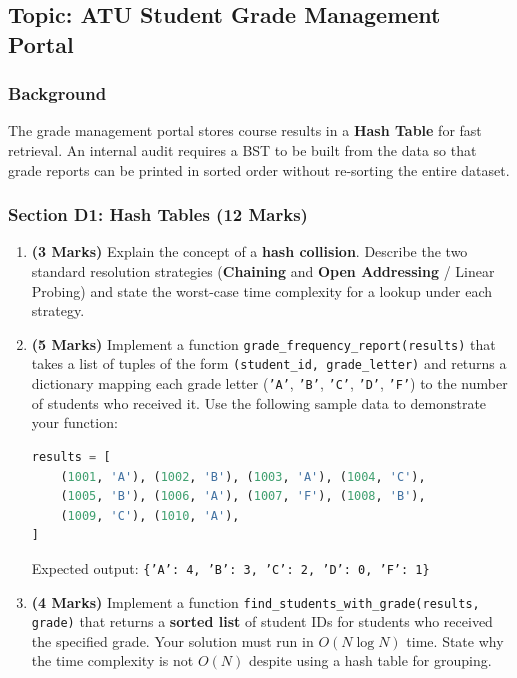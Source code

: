 \documentclass[11pt,a4paper]{article}
\begin{document}
\subsection*{Topic: ATU Student Grade Management Portal}

\subsubsection*{Background}
The grade management portal stores course results in a \textbf{Hash Table} for fast retrieval. An internal audit requires a BST to be built from the data so that grade reports can be printed in sorted order without re-sorting the entire dataset.

\subsubsection*{Section D1: Hash Tables (12 Marks)}

\begin{enumerate}[label=\textbf{D\arabic*.}]
    \item \textbf{(3 Marks)} Explain the concept of a \textbf{hash collision}. Describe the two standard resolution strategies (\textbf{Chaining} and \textbf{Open Addressing} / Linear Probing) and state the worst-case time complexity for a lookup under each strategy.

    \item \textbf{(5 Marks)} Implement a function \texttt{grade\_frequency\_report(results)} that takes a list of tuples of the form \texttt{(student\_id, grade\_letter)} and returns a dictionary mapping each grade letter (\texttt{'A'}, \texttt{'B'}, \texttt{'C'}, \texttt{'D'}, \texttt{'F'}) to the number of students who received it. Use the following sample data to demonstrate your function:
    \begin{lstlisting}[language=Python]
results = [
    (1001, 'A'), (1002, 'B'), (1003, 'A'), (1004, 'C'),
    (1005, 'B'), (1006, 'A'), (1007, 'F'), (1008, 'B'),
    (1009, 'C'), (1010, 'A'),
]
    \end{lstlisting}
    Expected output: \texttt{\{'A': 4, 'B': 3, 'C': 2, 'D': 0, 'F': 1\}}

    \item \textbf{(4 Marks)} Implement a function \texttt{find\_students\_with\_grade(results, grade)} that returns a \textbf{sorted list} of student IDs for students who received the specified grade. Your solution must run in $O(N \log N)$ time. State why the time complexity is not $O(N)$ despite using a hash table for grouping.
\end{enumerate}
\end{document}
